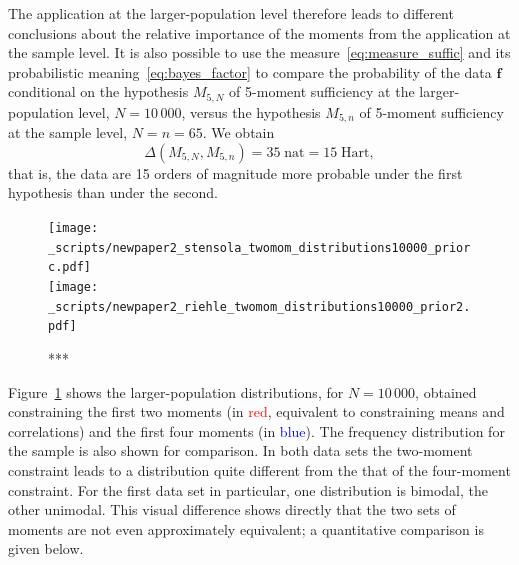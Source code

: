 \documentclass[\ifafour a4paper,12pt,\else a5paper,10pt,\fi%
onecolumn,oneside,article,%
british%
]{memoir}
\theoremstyle{remark}
\theoremstyle{innote}
\renewcommand*{\|}{\nonscript\,\vert\nonscript\;\mathopen{}}
\newcommand*{\yff}{f}
\newcommand*{\yf}{\bm{\yff}}
\newcommand*{\ydi}{\varDelta}
\newcommand*{\nat}{\textrm{nat}}
\newcommand*{\hart}{\textrm{Hart}}
\begin{document}
The application at the larger-population level therefore leads to different
conclusions about the relative importance of the moments from the
application at the sample level. It is also possible to use the
measure~\eqref{eq:measure_suffic} and its probabilistic
meaning~\eqref{eq:bayes_factor} to compare the probability of the data
$\yf$ conditional on the hypothesis $M_{5, N}$ of 5-moment sufficiency at
the larger-population level, $N=10\,000$, versus the hypothesis $M_{5, n}$ of
5-moment sufficiency at the sample level, $N=n=65$. We obtain
\begin{equation}
  \label{eq:diff_suff_n}
  \ydi(M_{5, N}, M_{5, n}) = 35\;\nat = 15\;\hart,
\end{equation}
that is, the data are 15 orders of magnitude more probable under the first
hypothesis than under the second.

\bigskip


\begin{figure}[!p]
\centering
\texttt{[image: \_scripts/newpaper2\_stensola\_twomom\_distributions10000\_priorc.pdf]}%
\\[3em]%
\texttt{[image: \_scripts/newpaper2\_riehle\_twomom\_distributions10000\_prior2.pdf]}%
\caption{***}
\label{fig:plots_2_4mom}
\end{figure}
Figure~\ref{fig:plots_2_4mom} shows the larger-population distributions, for
$N=10\,000$, obtained constraining the first two moments (in
\textcolor{red}{red}, equivalent to constraining means and correlations)
and the first four moments (in \textcolor{blue}{blue}). The frequency
distribution for the sample is also shown for comparison. In both data sets
the two-moment constraint leads to a distribution quite different from the
that of the four-moment constraint. For the first data set in particular,
one distribution is bimodal, the other unimodal. This visual difference
shows directly that the two sets of moments are not even approximately
equivalent; a quantitative comparison is given below.
\end{document}
